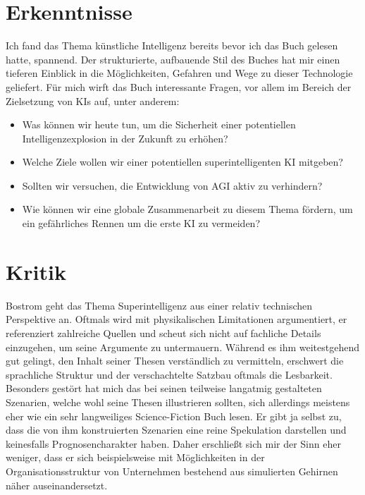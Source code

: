 \documentclass[twoside, a4paper, DIV=11, open=any, bibliography=totoc]{scrbook}
\begin{document}
\section{Erkenntnisse} \label{sec:literkenntnis}

Ich fand das Thema künstliche Intelligenz bereits bevor ich das Buch gelesen hatte, spannend.
Der strukturierte, aufbauende Stil des Buches hat mir einen tieferen Einblick in
die Möglichkeiten, Gefahren und Wege zu dieser Technologie geliefert.
Für mich wirft das Buch interessante Fragen, vor allem im Bereich der Zielsetzung von KIs auf,
unter anderem:

\begin{itemize}
  \item Was können wir heute tun, um die Sicherheit einer potentiellen Intelligenzexplosion
  in der Zukunft zu erhöhen?
  \item Welche Ziele wollen wir einer potentiellen superintelligenten KI mitgeben?
  \item Sollten wir versuchen, die Entwicklung von AGI aktiv zu verhindern?
  \item Wie können wir eine globale Zusammenarbeit zu diesem Thema fördern,
  um ein gefährliches Rennen um die erste KI zu vermeiden?
\end{itemize}

\section{Kritik} \label{sec:litkritik}

Bostrom geht das Thema Superintelligenz aus einer relativ technischen Perspektive
an. Oftmals wird mit physikalischen Limitationen argumentiert, er referenziert
zahlreiche Quellen und scheut sich nicht auf fachliche Details einzugehen, um seine
Argumente zu untermauern. Während es ihm weitestgehend gut gelingt, den Inhalt seiner
Thesen verständlich zu vermitteln, erschwert die sprachliche Struktur und der
verschachtelte Satzbau oftmals die Lesbarkeit.
Besonders gestört hat mich das bei seinen teilweise
langatmig gestalteten Szenarien, welche wohl seine Thesen illustrieren sollten,
sich allerdings meistens eher wie ein sehr langweiliges Science-Fiction Buch lesen.
Er gibt ja selbst zu, dass die von ihm konstruierten Szenarien eine reine Spekulation
darstellen und keinesfalls Prognosencharakter haben. Daher erschließt sich mir
der Sinn eher weniger, dass er sich beispielsweise mit Möglichkeiten in der
Organisationsstruktur von Unternehmen bestehend aus simulierten Gehirnen näher auseinandersetzt.
\end{document}
